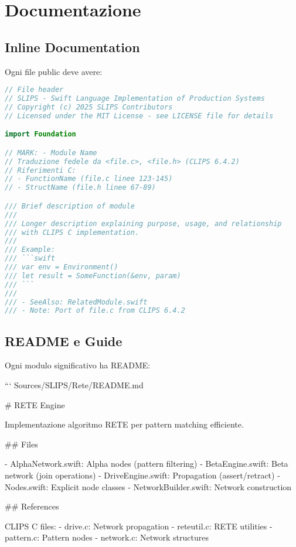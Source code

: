 \section{Documentazione}

\subsection{Inline Documentation}

Ogni file public deve avere:

\begin{lstlisting}[language=Swift]
// File header
// SLIPS - Swift Language Implementation of Production Systems
// Copyright (c) 2025 SLIPS Contributors
// Licensed under the MIT License - see LICENSE file for details

import Foundation

// MARK: - Module Name
// Traduzione fedele da <file.c>, <file.h> (CLIPS 6.4.2)
// Riferimenti C:
// - FunctionName (file.c linee 123-145)
// - StructName (file.h linee 67-89)

/// Brief description of module
///
/// Longer description explaining purpose, usage, and relationship
/// with CLIPS C implementation.
///
/// Example:
/// ```swift
/// var env = Environment()
/// let result = SomeFunction(&env, param)
/// ```
///
/// - SeeAlso: RelatedModule.swift
/// - Note: Port of file.c from CLIPS 6.4.2
\end{lstlisting}

\subsection{README e Guide}

Ogni modulo significativo ha README:

```
Sources/SLIPS/Rete/README.md

# RETE Engine

Implementazione algoritmo RETE per pattern matching efficiente.

## Files

- AlphaNetwork.swift: Alpha nodes (pattern filtering)
- BetaEngine.swift: Beta network (join operations)
- DriveEngine.swift: Propagation (assert/retract)
- Nodes.swift: Explicit node classes
- NetworkBuilder.swift: Network construction

## References

CLIPS C files:
- drive.c: Network propagation
- reteutil.c: RETE utilities
- pattern.c: Pattern nodes
- network.c: Network structures

